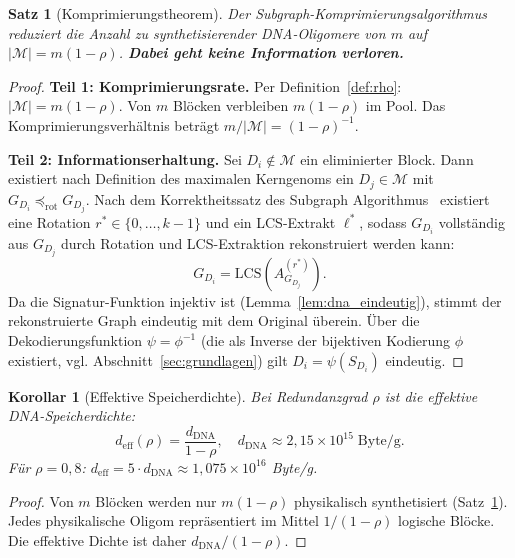 ﻿\documentclass[a4paper,12pt]{article}
\theoremstyle{definition}
\theoremstyle{plain}
\newtheorem{satz}{Satz}[section]
\newtheorem{korollar}{Korollar}[section]
\begin{document}
\begin{satz}[Komprimierungstheorem]
\label{satz:komprimierung}
  Der Subgraph-Komprimierungsalgorithmus reduziert die Anzahl zu
  synthetisierender DNA-Oligomere von $m$ auf
  $|\mathcal{M}| = m(1-\rho)$.
  \textbf{Dabei geht keine Information verloren.}
\end{satz}

\begin{proof}
  \textbf{Teil 1: Komprimierungsrate.}
  Per Definition~\ref{def:rho}: $|\mathcal{M}| = m(1-\rho)$.  Von $m$
  Blöcken verbleiben $m(1-\rho)$ im Pool.  Das Komprimierungsverhältnis
  beträgt $m / |\mathcal{M}| = (1-\rho)^{-1}$.

  \textbf{Teil 2: Informationserhaltung.}
  Sei $D_i \notin \mathcal{M}$ ein eliminierter Block.
  Dann existiert nach Definition des maximalen Kerngenoms ein
  $D_j \in \mathcal{M}$ mit $G_{D_i} \preceq_{\mathrm{rot}} G_{D_j}$.
  Nach dem Korrektheitssatz des Subgraph Algorithmus~\cite{dusgraph}
  existiert eine Rotation $r^* \in \{0, \ldots, k-1\}$ und ein
  LCS-Extrakt $\ell^*$, sodass $G_{D_i}$ vollständig aus $G_{D_j}$ durch
  Rotation und LCS-Extraktion rekonstruiert werden kann:
  \[
    G_{D_i} = \mathrm{LCS}\!\left(A_{G_{D_j}}^{(r^*)}\right).
  \]
  Da die Signatur-Funktion injektiv ist (Lemma~\ref{lem:dna_eindeutig}),
  stimmt der rekonstruierte Graph eindeutig mit dem Original überein.
  Über die Dekodierungsfunktion $\psi = \phi^{-1}$ (die als Inverse der
  bijektiven Kodierung $\phi$ existiert, vgl. Abschnitt~\ref{sec:grundlagen})
  gilt $D_i = \psi(S_{D_i})$ eindeutig. 
\end{proof}

\begin{korollar}[Effektive Speicherdichte]
\label{kor:dichte}
  Bei Redundanzgrad $\rho$ ist die effektive DNA-Speicherdichte:
  \[
    d_{\mathrm{eff}}(\rho) = \frac{d_{\mathrm{DNA}}}{1-\rho},
    \quad d_{\mathrm{DNA}} \approx 2{,}15 \times 10^{15}\;\text{Byte/g}.
  \]
  Für $\rho = 0{,}8$: $d_{\mathrm{eff}} = 5 \cdot d_{\mathrm{DNA}}
  \approx 1{,}075 \times 10^{16}$ Byte/g.
\end{korollar}

\begin{proof}
  Von $m$ Blöcken werden nur $m(1-\rho)$ physikalisch synthetisiert
  (Satz~\ref{satz:komprimierung}).  Jedes physikalische Oligom repräsentiert
  im Mittel $1/(1-\rho)$ logische Blöcke.  Die effektive Dichte ist daher
  $d_{\mathrm{DNA}} / (1-\rho)$. 
\end{proof}
\end{document}
